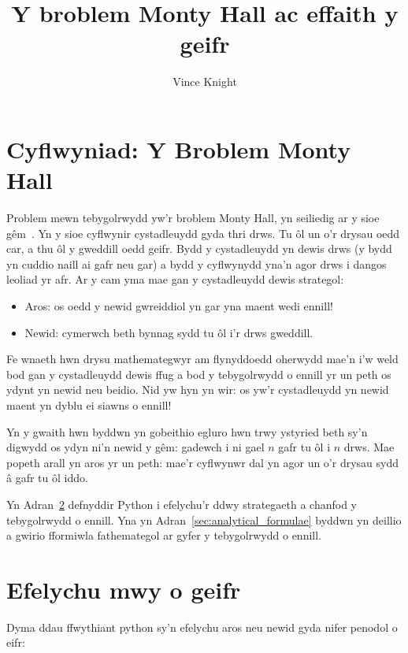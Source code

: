 \documentclass[a4paper]{article}
\title{Y broblem Monty Hall ac effaith y geifr}
\author{Vince Knight}
\date{}
\begin{document}
\maketitle

\section{Cyflwyniad: Y Broblem Monty Hall}

Problem mewn tebygolrwydd yw'r broblem Monty Hall, yn seiliedig ar y sioe
g\^{e}m~\cite{rosenhouse2009monty}. Yn y sioe cyflwynir cystadleuydd gyda thri
drws. Tu \^{o}l un o'r drysau oedd car, a thu \^{o}l y gweddill oedd geifr. Bydd
y cystadleuydd yn dewis drws (y bydd yn cuddio naill ai gafr neu gar) a bydd y
cyflwynydd yna'n agor drws i dangos leoliad yr afr. Ar y cam yma mae gan y
cystadleuydd dewis strategol:

\begin{itemize}
    \item Aros: os oedd y newid gwreiddiol yn gar yna maent wedi ennill!
    \item Newid: cymerwch beth bynnag sydd tu \^{o}l i'r drws gweddill.
\end{itemize}

Fe wnaeth hwn drysu mathemategwyr am flynyddoedd oherwydd mae'n i'w weld bod gan
y cystadleuydd dewis ffug a bod y tebygolrwydd o ennill yr un peth os ydynt yn
newid neu beidio. Nid yw hyn yn wir: os yw'r cystadleuydd yn newid maent yn
dyblu ei siawns o ennill!

Yn y gwaith hwn byddwn yn gobeithio egluro hwn trwy ystyried beth sy'n digwydd
os ydyn ni'n newid y g\^{e}m: gadewch i ni gael \(n\) gafr tu \^{o}l i \(n\)
drws. Mae popeth arall yn aros yr un peth: mae'r cyflwynwr dal yn agor un o'r
drysau sydd \^{a} gafr tu \^{o}l iddo.

Yn Adran~\ref{sec:simulation} defnyddir Python i efelychu'r ddwy strategaeth a
chanfod y tebygolrwydd o ennill. Yna yn Adran~\ref{sec:analytical_formulae}
byddwn yn deillio a gwirio fformiwla fathemategol ar gyfer y tebygolrwydd o
ennill.

\section{Efelychu mwy o geifr}\label{sec:simulation}

Dyma ddau ffwythiant python sy'n efelychu aros neu newid gyda nifer penodol o
eifr:
\end{document}
